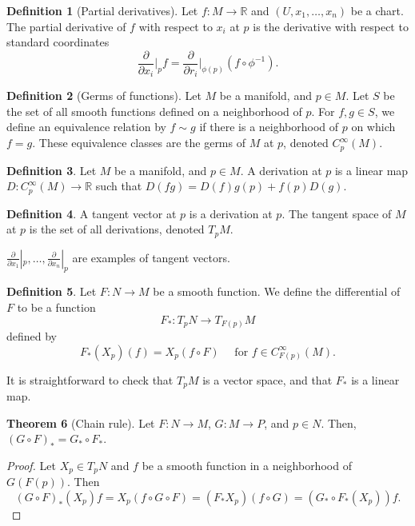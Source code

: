 \documentclass[]{article}
\theoremstyle{definition}
\newtheorem{theorem}{Theorem}[section] %
\theoremstyle{definition}
\newtheorem{definition}[theorem]{Definition} %
\begin{document}
\begin{definition}[Partial derivatives]
    Let $f:M \rightarrow \mathbb{R}$ and $(U, x_1, \dots, x_n)$ be a chart. The partial derivative of $f$ with respect to $x_i$ at $p$ is the derivative with respect to standard coordinates
    \[\frac{\partial}{\partial x_i}\bigg|_p f=\frac{\partial}{\partial r_i}\bigg|_{\phi(p)}(f\circ\phi^{-1}).\]
\end{definition}

\begin{definition}[Germs of functions]
    Let $M$ be a manifold, and $p\in M$. Let $S$ be the set of all smooth functions defined on a neighborhood of $p$. For $f, g\in S$, we define an equivalence relation by $f\sim g$ if there is a neighborhood of $p$ on which $f=g$. These equivalence classes are the germs of $M$ at $p$, denoted $C^\infty_p(M)$.
\end{definition}

\begin{definition}
    Let $M$ be a manifold, and $p\in M$. A derivation at $p$ is a linear map $D:C^\infty_p(M) \rightarrow \mathbb{R}$ such that $D(fg)=D(f)g(p)+f(p)D(g)$.
\end{definition}

\begin{definition}
    A tangent vector at $p$ is a derivation at $p$. The tangent space of $M$ at $p$ is the set of all derivations, denoted $T_pM$.
\end{definition}

$\frac{\partial}{\partial x_1}|_p, \dots, \frac{\partial}{\partial x_n}|_p$ are examples of tangent vectors. 

\begin{definition}
    Let $F: N \rightarrow M$ be a smooth function. We define the differential of $F$ to be a function\[F_*:T_pN \rightarrow T_{F(p)}M\] defined by \[F_*(X_p)(f)=X_p(f\circ F)\quad \text{ for } f\in C^\infty_{F(p)}(M).\]
\end{definition}

It is straightforward to check that $T_pM$ is a vector space, and that $F_*$ is a linear map.

\begin{theorem}[Chain rule]
    Let $F:N \rightarrow M$, $G:M \rightarrow P$, and $p\in N$. Then, $(G\circ F)_*=G_*\circ F_*$.
\end{theorem}
\begin{proof}
    Let $X_p\in T_pN$ and $f$ be a smooth function in a neighborhood of $G(F(p))$. Then \[(G\circ F)_*(X_p)f=X_p(f\circ G\circ F)=(F_*X_p)(f\circ G)=(G_*\circ F_*(X_p))f.\]
\end{proof}
\end{document}
